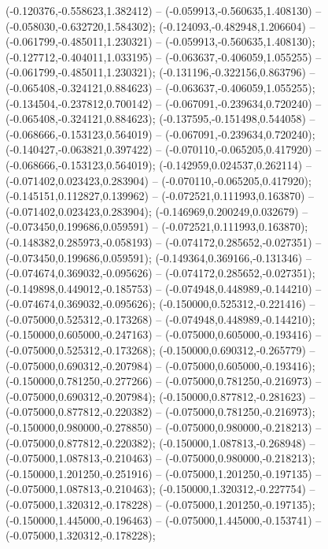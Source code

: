  (-0.120376,-0.558623,1.382412) -- (-0.059913,-0.560635,1.408130) -- (-0.058030,-0.632720,1.584302);
 (-0.124093,-0.482948,1.206604) -- (-0.061799,-0.485011,1.230321) -- (-0.059913,-0.560635,1.408130);
 (-0.127712,-0.404011,1.033195) -- (-0.063637,-0.406059,1.055255) -- (-0.061799,-0.485011,1.230321);
 (-0.131196,-0.322156,0.863796) -- (-0.065408,-0.324121,0.884623) -- (-0.063637,-0.406059,1.055255);
 (-0.134504,-0.237812,0.700142) -- (-0.067091,-0.239634,0.720240) -- (-0.065408,-0.324121,0.884623);
 (-0.137595,-0.151498,0.544058) -- (-0.068666,-0.153123,0.564019) -- (-0.067091,-0.239634,0.720240);
 (-0.140427,-0.063821,0.397422) -- (-0.070110,-0.065205,0.417920) -- (-0.068666,-0.153123,0.564019);
 (-0.142959,0.024537,0.262114) -- (-0.071402,0.023423,0.283904) -- (-0.070110,-0.065205,0.417920);
 (-0.145151,0.112827,0.139962) -- (-0.072521,0.111993,0.163870) -- (-0.071402,0.023423,0.283904);
 (-0.146969,0.200249,0.032679) -- (-0.073450,0.199686,0.059591) -- (-0.072521,0.111993,0.163870);
 (-0.148382,0.285973,-0.058193) -- (-0.074172,0.285652,-0.027351) -- (-0.073450,0.199686,0.059591);
 (-0.149364,0.369166,-0.131346) -- (-0.074674,0.369032,-0.095626) -- (-0.074172,0.285652,-0.027351);
 (-0.149898,0.449012,-0.185753) -- (-0.074948,0.448989,-0.144210) -- (-0.074674,0.369032,-0.095626);
 (-0.150000,0.525312,-0.221416) -- (-0.075000,0.525312,-0.173268) -- (-0.074948,0.448989,-0.144210);
 (-0.150000,0.605000,-0.247163) -- (-0.075000,0.605000,-0.193416) -- (-0.075000,0.525312,-0.173268);
 (-0.150000,0.690312,-0.265779) -- (-0.075000,0.690312,-0.207984) -- (-0.075000,0.605000,-0.193416);
 (-0.150000,0.781250,-0.277266) -- (-0.075000,0.781250,-0.216973) -- (-0.075000,0.690312,-0.207984);
 (-0.150000,0.877812,-0.281623) -- (-0.075000,0.877812,-0.220382) -- (-0.075000,0.781250,-0.216973);
 (-0.150000,0.980000,-0.278850) -- (-0.075000,0.980000,-0.218213) -- (-0.075000,0.877812,-0.220382);
 (-0.150000,1.087813,-0.268948) -- (-0.075000,1.087813,-0.210463) -- (-0.075000,0.980000,-0.218213);
 (-0.150000,1.201250,-0.251916) -- (-0.075000,1.201250,-0.197135) -- (-0.075000,1.087813,-0.210463);
 (-0.150000,1.320312,-0.227754) -- (-0.075000,1.320312,-0.178228) -- (-0.075000,1.201250,-0.197135);
 (-0.150000,1.445000,-0.196463) -- (-0.075000,1.445000,-0.153741) -- (-0.075000,1.320312,-0.178228);
